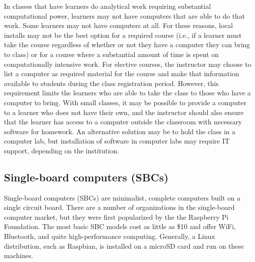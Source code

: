 In classes that have learners do analytical work requiring substantial computational power, learners may not have computers that are able to do that work. Some learners may not have computers at all. For these reasons, local installs may not be the best option for a required course (i.e., if a learner must take the course regardless of whether or not they have a computer they can bring to class) or for a course where a substantial amount of time is spent on computationally intensive work. For elective courses, the instructor may choose to list a computer as required material for the course and make that information available to students during the class registration period. However, this requirement limits the learners who are able to take the class to those who have a computer to bring. With small classes, it may be possible to provide a computer to a learner who does not have their own, and the instructor should also ensure that the learner has access to a computer outside the classroom with necessary software for homework. An alternative solution may be to hold the class in a computer lab, but installation of software in computer labs may require IT support, depending on the institution.

\subsection{Single-board computers (SBCs)}\label{sbc}


Single-board computers (SBCs) are minimalist, complete computers built on a
single circuit board.
There are a number of organizations in the single-board computer market, but
they were first popularized by the the Raspberry Pi Foundation.
The most basic SBC models cost as little as \$10 and offer WiFi, Bluetooth,
and quite high-performance computing.
Generally, a Linux distribution, such as Raspbian, is installed
on a microSD card and run on these machines.

